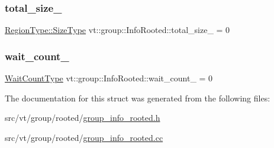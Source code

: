 \subsubsection{\texorpdfstring{total\+\_\+size\+\_\+}{total\_size\_}}
{\footnotesize\ttfamily \hyperlink{structvt_1_1group_1_1region_1_1_region_a9bb381adf31111aae34dbc644bad6c1f}{Region\+Type\+::\+Size\+Type} vt\+::group\+::\+Info\+Rooted\+::total\+\_\+size\+\_\+ = 0\hspace{0.3cm}{\ttfamily [protected]}}

\mbox{\label{structvt_1_1group_1_1_info_rooted_af4f9a1defdcf2c7242b25c45f319d224}} 
\subsubsection{\texorpdfstring{wait\+\_\+count\+\_\+}{wait\_count\_}}
{\footnotesize\ttfamily \hyperlink{structvt_1_1group_1_1_info_base_a0924de8df3a2ec72ebdd499ad8a28abf}{Wait\+Count\+Type} vt\+::group\+::\+Info\+Rooted\+::wait\+\_\+count\+\_\+ = 0\hspace{0.3cm}{\ttfamily [protected]}}



The documentation for this struct was generated from the following files\+:\begin{DoxyCompactItemize}
\item 
src/vt/group/rooted/\hyperlink{group__info__rooted_8h}{group\+\_\+info\+\_\+rooted.\+h}\item 
src/vt/group/rooted/\hyperlink{group__info__rooted_8cc}{group\+\_\+info\+\_\+rooted.\+cc}\end{DoxyCompactItemize}
